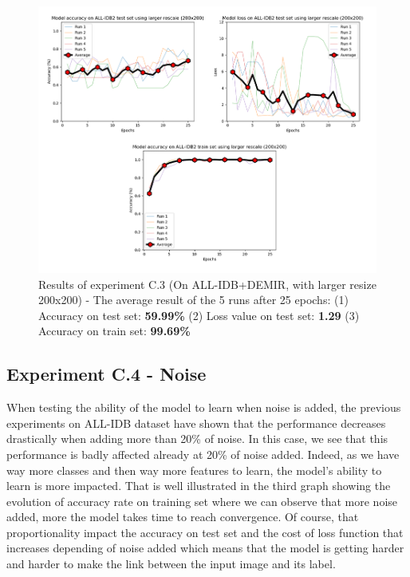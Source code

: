 \documentclass[11pt, openany]{report}
\theoremstyle{plain}
\theoremstyle{definition}
\theoremstyle{remark}
\begin{document}
\begin{figure}[H]
  \centering
  \includegraphics[scale=0.45]{Code/ch6-LeukemiaSubtypes/figures_result/ALL_IDB2/all_idb2-200x200.PNG}
  \caption{Results of experiment C.3 (On ALL-IDB+DEMIR, with larger resize 200x200) - The average result of the 5 runs after 25 epochs: (1) Accuracy on test set: \textbf{59.99\%} (2) Loss value on test set: \textbf{1.29} (3) Accuracy on train set: \textbf{99.69\%}}
  \label{fig:results-C3}
\end{figure}

\subsection{Experiment C.4 - Noise}

When testing the ability of the model to learn when noise is added, the previous experiments on ALL-IDB dataset have shown that the performance decreases drastically when adding more than 20\% of noise. In this case, we see that this performance is badly affected already at 20\% of noise added. Indeed, as we have way more classes and then way more features to learn, the model's ability to learn is more impacted. That is well illustrated in the third graph showing the evolution of accuracy rate on training set where we can observe that more noise added, more the model takes time to  reach convergence. Of course, that proportionality impact the accuracy on test set and the cost of loss function that increases depending of noise added which means that the model is getting harder and harder to make the link between the input image and its label.  
\end{document}
